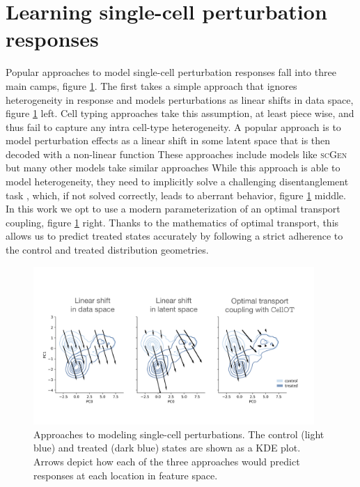 \section{Learning single-cell perturbation responses}
Popular approaches to model single-cell perturbation responses fall into three main camps, figure \ref{fig:arrows}.
The first takes a simple approach that ignores heterogeneity in response and models perturbations as linear shifts in data space, figure \ref{fig:arrows} left.
Cell typing approaches take this assumption, at least piece wise, and thus fail to capture any intra cell-type heterogeneity.
A popular approach is to model perturbation effects as a linear shift in some latent space that is then decoded with a non-linear function
These approaches include models like \textsc{scGen} \cite{lotfollahi2019} but many other models take similar approaches \cite{need}
While this approach is able to model heterogeneity, they need to implicitly solve a challenging disentanglement task \cite{locatello2018}, which, if not solved correctly, leads to aberrant behavior, figure \ref{fig:arrows} middle. 
In this work we opt to use a modern parameterization of an optimal transport coupling, figure \ref{fig:arrows} right.
Thanks to the mathematics of optimal transport, this allows us to predict treated states accurately by following a strict adherence to the control and treated distribution geometries.

\begin{figure}[ht]
  \begin{center}
    \includegraphics[width=0.95\textwidth]{figures/cellot-methods/arrow-cartoons.pdf}
  \end{center}
  \caption{Approaches to modeling single-cell perturbations. The control (light blue) and treated (dark blue) states are shown as a KDE plot. Arrows depict how each of the three approaches would predict responses at each location in feature space.}
  \label{fig:arrows}
\end{figure}


